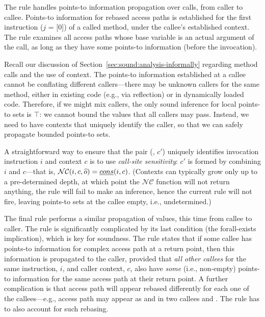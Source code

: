 The  rule handles points-to information propagation over calls, from caller to callee. Points-to information for rebased access paths is established for the first instruction ($j$ = [0]) of a called method, under the callee's established context. The rule examines all access paths whose base variable is an actual argument of the call, as long as they have some points-to information (before the invocation).

Recall our discussion of Section~\ref{sec:sound:analysis-informally} regarding method calls and the use of context. The points-to information established at a callee cannot be conflating different callers---there may be unknown callers for the same method, either in existing code (e.g., via reflection) or in dynamically loaded code. Therefore, if we might mix callers, the only sound inference for local points-to sets is $\top$: we cannot bound the values that all callers may pass. Instead, we need to have contexts that uniquely identify the caller, so that we can safely propagate bounded points-to sets.

A straightforward way to ensure that the pair (, $c'$) uniquely identifies invocation instruction $i$ and context $c$ is to use \emph{call-site sensitivity}: $c'$ is formed by combining $i$ and $c$---that is, $\mathcal{NC}(i, c, \widehat{o}) = \emph{cons}(i, c)$. (Contexts can typically grow only up to a pre-determined depth, at which point the $\mathcal{NC}$ function will not return anything, the  rule will fail to make an inference, hence the current rule will not fire, leaving points-to sets at the callee empty, i.e., undetermined.)


The final rule performs a similar propagation of values, this time from callee to caller. The rule is significantly complicated by its last condition (the forall-exists implication), which is key for soundness. The rule states that if some callee has points-to information for complex access path  at a return point, then this information is propagated to the caller, provided that \todo{} \emph{all other callees} for the same instruction, $i$, and caller context, $c$, also have \emph{some} (i.e., non-empty) points-to information for the same access path  at their return point. A further complication is that access path  will appear rebased differently for each one of the callees---e.g., access path  may appear as  and  in two callees  and . The rule has to also account for such rebasing.

